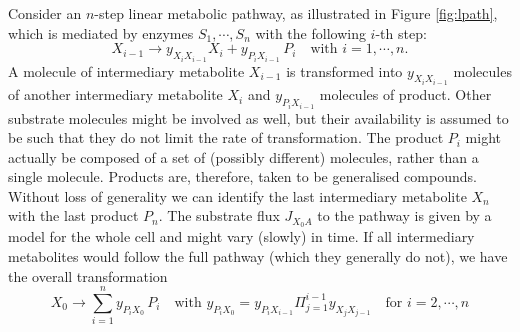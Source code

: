 Consider an $n$-step linear metabolic pathway, as illustrated in Figure \ref{fig:lpath}, which is mediated by enzymes $S_1, \cdots, S_n$ with the following $i$-th step:
\begin{equation} \label{eqn:step}
  X_{i-1} \rightarrow y_{X_i X_{i - 1}} X_i + y_{P_i X_{i - 1}} \, P_i
  \quad \mbox{with } i = 1, \cdots, n.
\end{equation}
A molecule of intermediary metabolite $X_{i - 1}$ is transformed into $y_{X_i X_{i - 1}}$ molecules of another intermediary metabolite $X_i$ and $y_{P_i X_{i - 1}}$ molecules of product. 
Other substrate molecules might be involved as well, but their availability is assumed to be such that they do not limit the rate of transformation. 
The product $P_i$ might actually be composed of a set of (possibly different) molecules, rather than a single molecule. Products are, therefore, taken to be generalised compounds. 
Without loss of generality we can identify the last intermediary metabolite $X_n$ with the last product $P_n$. 
The substrate flux $J_{X_0A}$ to the pathway is given by a model for the whole cell and might vary (slowly) in time. 
If all intermediary metabolites would follow the full pathway (which they generally do not), we have the overall transformation
\begin{equation} \label{eqn:path}
  X_0 \rightarrow \sum_{i = 1}^n y_{P_i X_0} \, P_i \quad \mbox{with }
  y_{P_i X_0} = y_{P_i X_{i - 1}} \Pi_{j = 1}^{i - 1} y_{X_j X_{j - 1}} 
  \quad \mbox{for } i = 2, \cdots, n
\end{equation}


